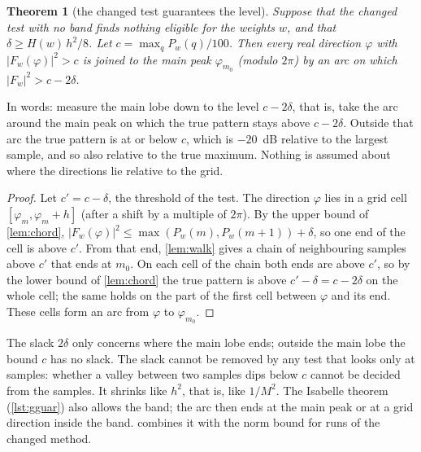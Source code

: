 \documentclass[11pt]{amsart}
\theoremstyle{plain}
\newtheorem{theorem}{Theorem}
\theoremstyle{definition}
\newcommand{\thy}[1]{\texttt{#1}}
\begin{document}
\begin{theorem}[the changed test guarantees the level]\label{thm:guarantee}
Suppose that the changed test with no band finds nothing eligible for the weights $w$, and that
$\delta \ge H(w)\, h^2/8$.  Let $c = \max_q P_w(q)/100$.  Then every real direction $\varphi$ with
$|F_w(\varphi)|^2 > c$ is joined to the main peak $\varphi_{m_0}$ (modulo $2\pi$) by an arc on which
$|F_w|^2 > c - 2\delta$.
\end{theorem}

In words: measure the main lobe down to the level $c - 2\delta$, that is, take the arc around the main
peak on which the true pattern stays above $c - 2\delta$.  Outside that arc the true pattern is at or
below $c$, which is $-20$~dB relative to the largest sample, and so also relative to the true maximum.
Nothing is assumed about where the directions lie relative to the grid.

\begin{proof}
Let $c' = c - \delta$, the threshold of the test.  The direction $\varphi$ lies in a grid cell
$[\varphi_m, \varphi_m + h]$ (after a shift by a multiple of $2\pi$).  By the upper bound of
\cref{lem:chord}, $|F_w(\varphi)|^2 \le \max(P_w(m), P_w(m+1)) + \delta$, so one end of the cell is
above $c'$.  From that end, \cref{lem:walk} gives a chain of neighbouring samples above $c'$ that ends
at $m_0$.  On each cell of the chain both ends are above $c'$, so by the lower bound of
\cref{lem:chord} the true pattern is above $c' - \delta = c - 2\delta$ on the whole cell; the same holds
on the part of the first cell between $\varphi$ and its end.  These cells form an arc from $\varphi$ to
$\varphi_{m_0}$.
\end{proof}

The slack $2\delta$ only concerns where the main lobe ends; outside the main lobe the bound $c$ has no
slack.  The slack cannot be removed by any test that looks only at samples: whether a valley between
two samples dips below $c$ cannot be decided from the samples.  It shrinks like $h^2$, that is, like
$1/M^2$.  The Isabelle theorem (\cref{lst:gguar}) also allows the band; the arc then ends at the main
peak or at a grid direction inside the band.   combines it with the norm bound for runs
of the changed method.




\end{document}
